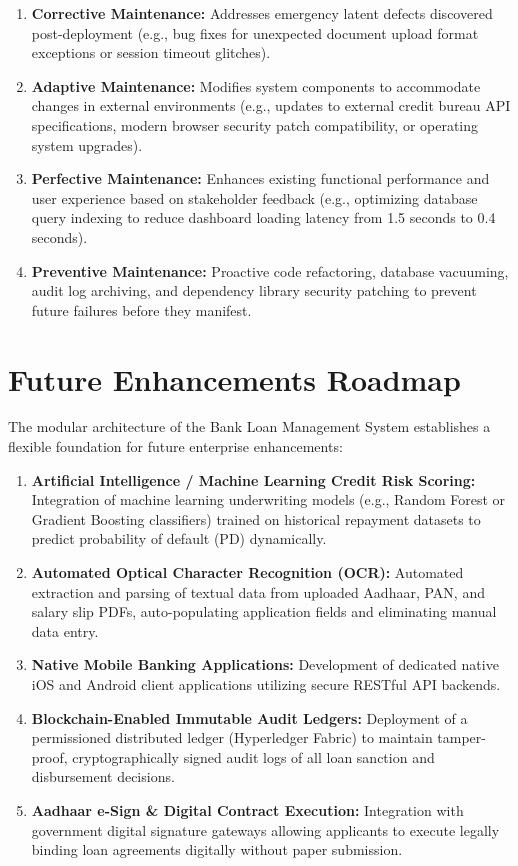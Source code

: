 \documentclass[12pt,a4paper,oneside]{report}
\begin{document}
\begin{enumerate}
  \item \textbf{Corrective Maintenance:} Addresses emergency latent defects discovered post-deployment (e.g., bug fixes for unexpected document upload format exceptions or session timeout glitches).
  \item \textbf{Adaptive Maintenance:} Modifies system components to accommodate changes in external environments (e.g., updates to external credit bureau API specifications, modern browser security patch compatibility, or operating system upgrades).
  \item \textbf{Perfective Maintenance:} Enhances existing functional performance and user experience based on stakeholder feedback (e.g., optimizing database query indexing to reduce dashboard loading latency from 1.5 seconds to 0.4 seconds).
  \item \textbf{Preventive Maintenance:} Proactive code refactoring, database vacuuming, audit log archiving, and dependency library security patching to prevent future failures before they manifest.
\end{enumerate}

\section{Future Enhancements Roadmap}

The modular architecture of the Bank Loan Management System establishes a flexible foundation for future enterprise enhancements:

\begin{enumerate}
  \item \textbf{Artificial Intelligence / Machine Learning Credit Risk Scoring:} Integration of machine learning underwriting models (e.g., Random Forest or Gradient Boosting classifiers) trained on historical repayment datasets to predict probability of default (PD) dynamically.
  \item \textbf{Automated Optical Character Recognition (OCR):} Automated extraction and parsing of textual data from uploaded Aadhaar, PAN, and salary slip PDFs, auto-populating application fields and eliminating manual data entry.
  \item \textbf{Native Mobile Banking Applications:} Development of dedicated native iOS and Android client applications utilizing secure RESTful API backends.
  \item \textbf{Blockchain-Enabled Immutable Audit Ledgers:} Deployment of a permissioned distributed ledger (Hyperledger Fabric) to maintain tamper-proof, cryptographically signed audit logs of all loan sanction and disbursement decisions.
  \item \textbf{Aadhaar e-Sign \& Digital Contract Execution:} Integration with government digital signature gateways allowing applicants to execute legally binding loan agreements digitally without paper submission.
\end{enumerate}
\end{document}
